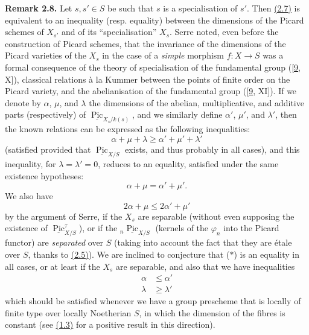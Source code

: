 \documentclass{article}
\newenvironment{rmenv}[1]
  {\phantomsection\par\smallskip\noindent\textbf{#1.}\rmfamily}
  {\par\smallskip}
\newcommand{\oldpage}[1]{\marginpar{\footnotesize$\Big\vert$ \textit{p.~#1}}}
\theoremstyle{definition}
\theoremstyle{definition}
\theoremstyle{definition}
\theoremstyle{definition}
\theoremstyle{remark}
\begin{document}
\leavevmode{}%
\begin{rmenv}{Remark 2.8}
Let \(s,s'\in S\) be such that \(s\) is a specialisation of \(s'\).
Then \protect\hyperlink{fga-3-vi-corollary-2.7}{(2.7)} is equivalent to an inequality (resp. equality) between the dimensions of the Picard schemes of \(X_{s'}\) and of its ``specialisation'' \(X_s\).
Serre noted, even before the construction of Picard schemes, that the invariance of the dimensions of the Picard varieties of the \(X_s\) in the case of a \emph{simple} morphism \(f\colon X\to S\) was a formal consequence of the theory of specialisation of the fundamental group ({[}\protect\hyperlink{ref-Gro1960b}{9}, X{]}), classical relations à la Kummer between the points of finite order on the Picard variety, and the abelianisation of the fundamental group ({[}\protect\hyperlink{ref-Gro1960b}{9}, XI{]}).
If we denote by \(\alpha\), \(\mu\), and \(\lambda\) the dimensions of the abelian, multiplicative, and additive parts (respectively) of \(\underline{\operatorname{Pic}}_{X_s/k(s)}\), and we similarly define \(\alpha'\), \(\mu'\), and \(\lambda'\), then the known relations can be expressed as the following inequalities:
\[
  \alpha+\mu+\lambda
  \geqslant\alpha'+\mu'+\lambda'
\tag{$\ast$}
\]
(satisfied provided that \(\underline{\operatorname{Pic}}_{X/S}\) exists, and thus probably in all cases), and this inequality, for \(\lambda=\lambda'=0\), reduces to an equality, satisfied under the same existence hypotheses:
\[
  \alpha+\mu
  = \alpha'+\mu'.
\]
We also have
\[
  2\alpha+\mu
  \leqslant 2\alpha'+\mu'
\tag{$\ast\ast$}
\]
\oldpage{236-15}by the argument of Serre, if the \(X_s\) are separable (without even supposing the existence of \(\underline{\operatorname{Pic}}_{X/S}^\tau\)), or if the \({}_n\underline{\operatorname{Pic}}_{X/S}\) (kernels of the \(\varphi_n\) into the Picard functor) are \emph{separated} over \(S\) (taking into account the fact that they are étale over \(S\), thanks to \protect\hyperlink{fga-3-vi-theorem-2.5}{(2.5)}).
We are inclined to conjecture that (\(\ast\)) is an equality in all cases, or at least if the \(X_s\) are separable, and also that we have inequalities
\[
  \begin{aligned}
    \alpha &\leqslant\alpha'
  \\\lambda &\geqslant\lambda'
  \end{aligned}
\tag{$\ast\ast\ast$}
\]
which should be satisfied whenever we have a group prescheme that is locally of finite type over locally Noetherian \(S\), in which the dimension of the fibres is constant (see \protect\hyperlink{fga-3-vi-lemma-1.3}{(1.3)} for a positive result in this direction).

\end{rmenv}
\end{document}
